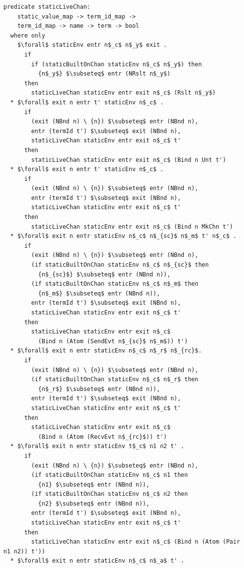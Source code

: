 \documentclass[letterpaper, 11pt]{extarticle}
\begin{document}
\begin{lstlisting}[language=logic, mathescape]
  predicate staticLiveChan:
    static_value_map -> term_id_map ->
    term_id_map -> name -> term -> bool
  where only
    $\forall$ staticEnv entr n$_c$ n$_y$ exit .
      if
        if (staticBuiltOnChan staticEnv n$_c$ n$_y$) then
          {n$_y$} $\subseteq$ entr (NRslt n$_y$)
      then
        staticLiveChan staticEnv entr exit n$_c$ (Rslt n$_y$)
  * $\forall$ exit n entr t' staticEnv n$_c$ .
      if 
        (exit (NBnd n) \ {n}) $\subseteq$ entr (NBnd n),
        entr (termId t') $\subseteq$ exit (NBnd n),
        staticLiveChan staticEnv entr exit n$_c$ t'
      then 
        staticLiveChan staticEnv entr exit n$_c$ (Bind n Unt t')
  * $\forall$ exit n entr t' staticEnv n$_c$ .
      if
        (exit (NBnd n) \ {n}) $\subseteq$ entr (NBnd n),
        entr (termId t') $\subseteq$ exit (NBnd n),
        staticLiveChan staticEnv entr exit n$_c$ t'
      then 
        staticLiveChan staticEnv entr exit n$_c$ (Bind n MkChn t')
  * $\forall$ exit n entr staticEnv n$_c$ n$_{sc}$ n$_m$ t' n$_c$ .
      if
        (exit (NBnd n) \ {n}) $\subseteq$ entr (NBnd n),
        (if staticBuiltOnChan staticEnv n$_c$ n$_{sc}$ then
          {n$_{sc}$} $\subseteq$ entr (NBnd n)),
        (if staticBuiltOnChan staticEnv n$_c$ n$_m$ then 
          {n$_m$} $\subseteq$ entr (NBnd n)),
        entr (termId t') $\subseteq$ exit (NBnd n),
        staticLiveChan staticEnv entr exit n$_c$ t'
      then
        staticLiveChan staticEnv entr exit n$_c$
          (Bind n (Atom (SendEvt n$_{sc}$ n$_m$)) t')
  * $\forall$ exit n entr staticEnv n$_c$ n$_r$ n$_{rc}$.    
      if
        (exit (NBnd n) \ {n}) $\subseteq$ entr (NBnd n),
        (if staticBuiltOnChan staticEnv n$_c$ n$_r$ then
          {n$_r$} $\subseteq$ entr (NBnd n)),
        entr (termId t') $\subseteq$ exit (NBnd n),
        staticLiveChan staticEnv entr exit n$_c$ t'
      then
        staticLiveChan staticEnv entr exit n$_c$
          (Bind n (Atom (RecvEvt n$_{rc}$)) t')
  * $\forall$ exit n entr staticEnv t$_c$ n1 n2 t' .
      if
        (exit (NBnd n) \ {n}) $\subseteq$ entr (NBnd n),
        (if staticBuiltOnChan staticEnv n$_c$ n1 then
          {n1} $\subseteq$ entr (NBnd n)),
        (if staticBuiltOnChan staticEnv n$_c$ n2 then
          {n2} $\subseteq$ entr (NBnd n)),
        entr (termId t') $\subseteq$ exit (NBnd n),
        staticLiveChan staticEnv entr exit n$_c$ t'
      then
        staticLiveChan staticEnv entr exit n$_c$ (Bind n (Atom (Pair n1 n2)) t'))
  * $\forall$ exit n entr staticEnv n$_c$ n$_a$ t' . 

\end{lstlisting}
\end{document}
